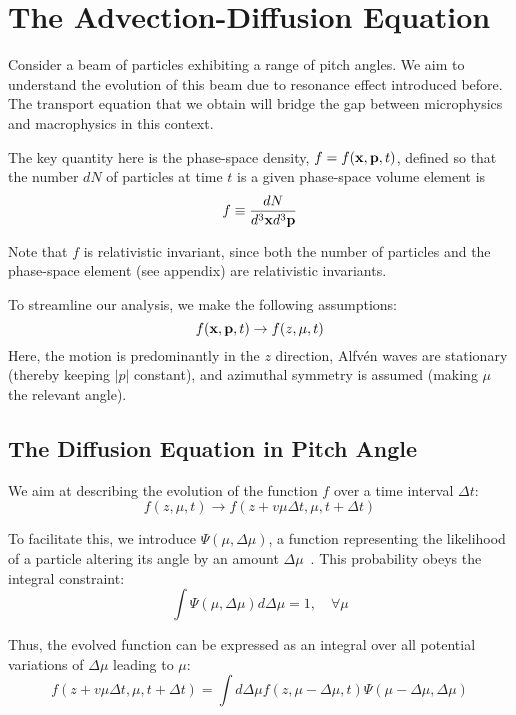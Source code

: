 \section{The Advection-Diffusion Equation}

Consider a beam of particles exhibiting a range of pitch angles. We aim to understand the evolution of this beam due to resonance effect introduced before. 
%
The transport equation that we obtain will bridge the gap between microphysics and macrophysics in this context.

The key quantity here is the phase-space density, \( f = f (\vb x, \vb p, t) \), defined so that the number \( d N \) of particles at time \( t \) is a given phase-space volume element is
%
\[
f \equiv \frac{dN}{d^3 \vb x d^3 \vb p}
\]

Note that \( f \) is relativistic invariant, since both the number of particles and the phase-space element {\color{red}(see appendix)} are relativistic invariants.

 To streamline our analysis, we make the following assumptions:
%
\begin{equation}
f(\vb{x}, \vb{p}, t) \rightarrow f(z, \mu, t)
\end{equation}
%
Here, the motion is predominantly in the \( z \) direction, Alfv\'en waves are stationary (thereby keeping \( |p| \) constant), and azimuthal symmetry is assumed (making \( \mu \) the relevant angle).

\subsection{The Diffusion Equation in Pitch Angle}

We aim at describing the evolution of the function \( f \) over a time interval \( \Delta t \):
%
\begin{equation}
f(z, \mu, t) \rightarrow f(z + v\mu\Delta t,\mu, t + \Delta t)
\end{equation}

To facilitate this, we introduce \(\Psi(\mu, \Delta \mu)\), a function representing the likelihood of a particle altering its angle by an amount \( \Delta\mu \)~. 
%
This probability obeys the integral constraint:
%
\begin{equation}\label{eq:normpsi}
\int \Psi(\mu, \Delta\mu) d\Delta\mu = 1, \quad \forall \mu
\end{equation}

Thus, the evolved function can be expressed as an integral over all potential variations of \( \Delta \mu \) leading to \( \mu \): 
%
\begin{equation}\label{eq:distribpert}
f(z + v\mu\Delta t, \mu, t+\Delta t) = \int d\Delta \mu f(z, \mu-\Delta\mu, t) \Psi(\mu-\Delta\mu, \Delta\mu)
\end{equation}

